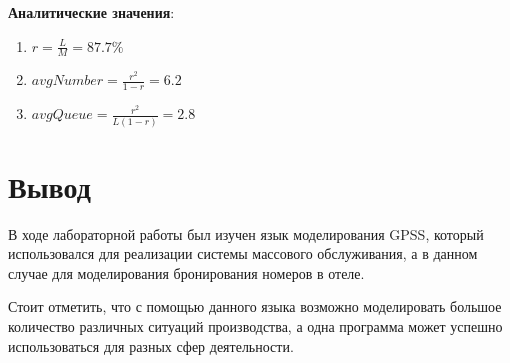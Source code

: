 \documentclass[a4paper, 12pt]{article}   	%
\begin{document}
    \textbf{Аналитические значения}:
    \begin{enumerate}
        \item $r = \frac{L}{M} = 87.7 \%$
        \item $avgNumber = \frac{r^2}{1 - r} = 6.2$
        \item $avgQueue = \frac{r^2}{L(1-r)} = 2.8$
    \end{enumerate}


\newpage
\section{Вывод}
    В ходе лабораторной работы был изучен язык моделирования GPSS, который использовался для реализации системы массового обслуживания, а в данном случае для моделирования бронирования номеров в отеле.
    
    Стоит отметить, что с помощью данного языка возможно моделировать большое количество различных ситуаций производства, а одна программа может успешно использоваться для разных сфер деятельности.
\end{document}

